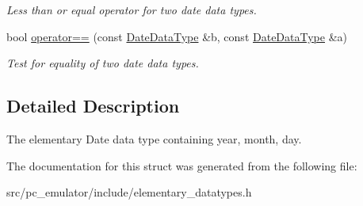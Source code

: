 \begin{DoxyCompactItemize}
\begin{DoxyCompactList}\small\item\em Less than or equal operator for two date data types. \end{DoxyCompactList}\item 
bool \hyperlink{structpc__emulator_1_1DateDataType_a448cdf37db29cd3406b60e24c845e4c7}{operator==} (const \hyperlink{structpc__emulator_1_1DateDataType}{Date\+Data\+Type} \&b, const \hyperlink{structpc__emulator_1_1DateDataType}{Date\+Data\+Type} \&a)\hypertarget{structpc__emulator_1_1DateDataType_a448cdf37db29cd3406b60e24c845e4c7}{}\label{structpc__emulator_1_1DateDataType_a448cdf37db29cd3406b60e24c845e4c7}

\begin{DoxyCompactList}\small\item\em Test for equality of two date data types. \end{DoxyCompactList}\end{DoxyCompactItemize}


\subsection{Detailed Description}
The elementary Date data type containing year, month, day. 

The documentation for this struct was generated from the following file\+:\begin{DoxyCompactItemize}
\item 
src/pc\+\_\+emulator/include/elementary\+\_\+datatypes.\+h\end{DoxyCompactItemize}
